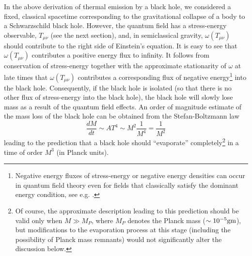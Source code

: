 \documentclass[12pt]{article}
\theoremstyle{plain}
\theoremstyle{definition}
\def\ben{\begin{equation}}
\def\een{\end{equation}}
\begin{document}
In the above derivation of thermal emission by a black hole, we considered a fixed, classical spacetime corresponding
to the gravitational collapse of a body to a Schwarzschild black hole. However, the quantum field has a stress-energy observable, $T_{\mu\nu}$ (see the next section), and, in semiclassical gravity, $\omega(T_{\mu\nu})$ should contribute to the right side of Einstein's equation. It is easy to see that $\omega(T_{\mu\nu})$ contributes a positive energy flux to infinity. It follows from conservation of stress-energy together with the approximate stationarity of $\omega$ at late times that $\omega(T_{\mu\nu})$ contributes a corresponding flux of negative energy\footnote{Negative energy fluxes of stress-energy or negative energy densities can occur in quantum field theory even for fields that classically satisfy the dominant energy condition, see e.g. \cite{fewsterqei,ford}.} into the black hole. Consequently, if the black hole is isolated (so that there is no other flux of stress-energy into the black hole), the black hole will slowly lose mass as a result of the quantum field effects. An order of magnitude estimate of the mass loss of the
 black hole can be obtained from the Stefan-Boltzmann law
\ben
\frac{dM}{dt} \sim A T^4 \sim M^2 \frac{1}{M^4} = \frac{1}{M^2}
\een
leading to the prediction that a black hole should ``evaporate'' completely\footnote{Of course, the approximate description leading to this prediction should be valid only when $M \gg M_P$, where $M_P$ denotes the Planck mass ($\sim 10^{-5} \rm{gm}$), but modifications to the evaporation process at this stage (including the possibility of Planck mass remnants) would not significantly alter the discussion below.} in a time of order $M^3$ (in Planck units).
\end{document}
